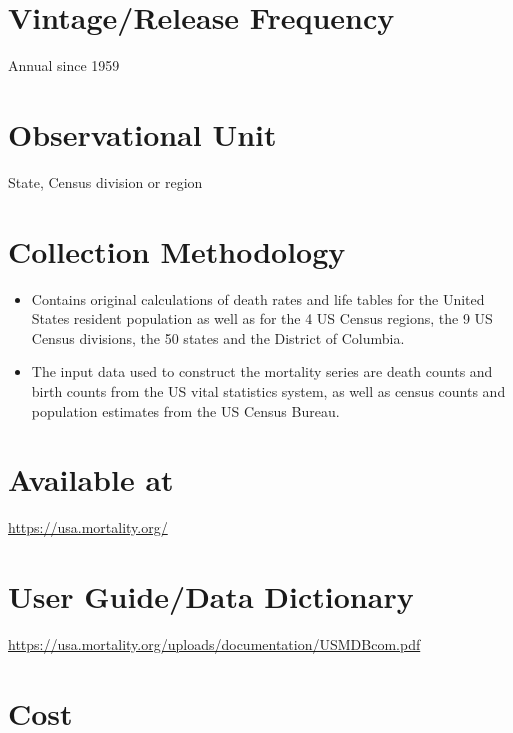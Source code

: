 \documentclass[
]{book}
\providecommand{\tightlist}{%
  \setlength{\itemsep}{0pt}\setlength{\parskip}{0pt}}
\begin{document}
\hypertarget{vintagerelease-frequency-91}{%
\section{Vintage/Release Frequency}\label{vintagerelease-frequency-91}}

Annual since 1959

\hypertarget{observational-unit-91}{%
\section{Observational Unit}\label{observational-unit-91}}

State, Census division or region

\hypertarget{collection-methodology-91}{%
\section{Collection Methodology}\label{collection-methodology-91}}

\begin{itemize}
\tightlist
\item
  Contains original calculations of death rates and life tables for the United States resident population as well as for the 4 US Census regions, the 9 US Census divisions, the 50 states and the District of Columbia.
\item
  The input data used to construct the mortality series are death counts and birth counts from the US vital statistics system, as well as census counts and population estimates from the US Census Bureau.
\end{itemize}

\hypertarget{available-at-91}{%
\section{Available at}\label{available-at-91}}

\url{https://usa.mortality.org/}

\hypertarget{user-guidedata-dictionary-91}{%
\section{User Guide/Data Dictionary}\label{user-guidedata-dictionary-91}}

\url{https://usa.mortality.org/uploads/documentation/USMDBcom.pdf}

\hypertarget{cost-91}{%
\section{Cost}\label{cost-91}}
\end{document}

